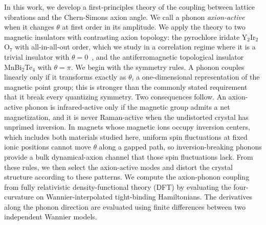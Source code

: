 \documentclass[galley,aps,pra,10pt,amsmath,amssymb,
    superscriptaddress,nofootinbib,longbibliography]{revtex4-2}
\newcounter{comm}
\def\commnext{\stepcounter{comm}}
\def\commtext{{\bf\color{blue}[\arabic{comm}]}}
\def\commmar{{\bf\color{blue}[\arabic{comm}]}}
\def\dsm#1{\commnext\marginpar{\small DS\commmar: #1}\commtext}
\def\dsm#1{}
\newcommand{\MBT}{MnBi$_2$Te$_4$}
\newcommand{\YIO}{Y$_2$Ir$_2$O$_7$}
\begin{document}
In this work, we develop a first-principles theory of the coupling between lattice vibrations and the Chern-Simons axion angle. We call a phonon \emph{axion-active} when it changes $\theta$ at first order in its amplitude. We apply the theory to two magnetic insulators with contrasting axion topology: the pyrochlore iridate \YIO{} with all-in-all-out order, which we study in a correlation regime where it is a trivial insulator with $\theta=0$~\cite{wan2011topological, witczak2014correlated}, and the antiferromagnetic topological insulator \MBT{} with $\theta=\pi$. We begin with the symmetry rules. A phonon couples linearly only if it transforms exactly as $\theta$, a one-dimensional representation of the magnetic point group; this is stronger than the commonly stated requirement that it break every quantizing symmetry. Two consequences follow. An axion-active phonon is infrared-active only if the magnetic group admits a net magnetization, and it is never Raman-active when the undistorted crystal has unprimed \dsm{``Primed" and ``unprimed" haven't been defined yet. \\ \textcolor{red}{AU: perhaps we can call it ``pure inversion (i.e., not coupled with time reversal)''.}} inversion. In magnets whose magnetic ions occupy inversion centers, which includes both materials studied here, uniform spin fluctuations at fixed ionic positions cannot move $\theta$ along a gapped path, so inversion-breaking phonons provide a bulk dynamical-axion channel that those spin fluctuations lack. From these rules, we then select the axion-active modes and distort the crystal structure according to these patterns. We compute the axion-phonon coupling from fully relativistic density-functional theory (DFT) by evaluating the four-curvature on Wannier-interpolated tight-binding Hamiltonians. The derivatives along the phonon direction are evaluated using finite differences between two independent Wannier models. 
\end{document}
